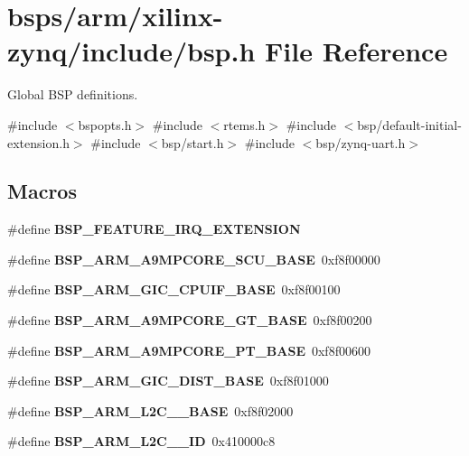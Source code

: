 \hypertarget{bsps_2arm_2xilinx-zynq_2include_2bsp_8h}{}\section{bsps/arm/xilinx-\/zynq/include/bsp.h File Reference}
\label{bsps_2arm_2xilinx-zynq_2include_2bsp_8h}


Global B\+SP definitions.  


{\ttfamily \#include $<$bspopts.\+h$>$}\newline
{\ttfamily \#include $<$rtems.\+h$>$}\newline
{\ttfamily \#include $<$bsp/default-\/initial-\/extension.\+h$>$}\newline
{\ttfamily \#include $<$bsp/start.\+h$>$}\newline
{\ttfamily \#include $<$bsp/zynq-\/uart.\+h$>$}\newline
\subsection*{Macros}
\begin{DoxyCompactItemize}
\item 
\#define {\bfseries B\+S\+P\+\_\+\+F\+E\+A\+T\+U\+R\+E\+\_\+\+I\+R\+Q\+\_\+\+E\+X\+T\+E\+N\+S\+I\+ON}
\item 
\#define {\bfseries B\+S\+P\+\_\+\+A\+R\+M\+\_\+\+A9\+M\+P\+C\+O\+R\+E\+\_\+\+S\+C\+U\+\_\+\+B\+A\+SE}~0xf8f00000
\item 
\#define {\bfseries B\+S\+P\+\_\+\+A\+R\+M\+\_\+\+G\+I\+C\+\_\+\+C\+P\+U\+I\+F\+\_\+\+B\+A\+SE}~0xf8f00100
\item 
\#define {\bfseries B\+S\+P\+\_\+\+A\+R\+M\+\_\+\+A9\+M\+P\+C\+O\+R\+E\+\_\+\+G\+T\+\_\+\+B\+A\+SE}~0xf8f00200
\item 
\#define {\bfseries B\+S\+P\+\_\+\+A\+R\+M\+\_\+\+A9\+M\+P\+C\+O\+R\+E\+\_\+\+P\+T\+\_\+\+B\+A\+SE}~0xf8f00600
\item 
\#define {\bfseries B\+S\+P\+\_\+\+A\+R\+M\+\_\+\+G\+I\+C\+\_\+\+D\+I\+S\+T\+\_\+\+B\+A\+SE}~0xf8f01000
\item 
\#define {\bfseries B\+S\+P\+\_\+\+A\+R\+M\+\_\+\+L2\+C\+\_\+\_\+\+B\+A\+SE}~0xf8f02000
\item 
\#define {\bfseries B\+S\+P\+\_\+\+A\+R\+M\+\_\+\+L2\+C\+\_\+\_\+\+ID}~0x410000c8
\end{DoxyCompactItemize}
